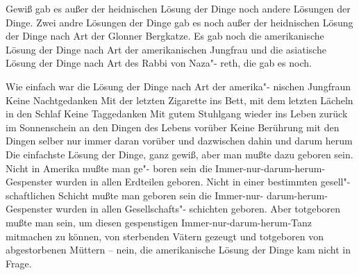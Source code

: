 Gewiß gab es außer der heidnischen Lösung der Dinge noch
andere Lösungen der Dinge. Zwei andre Lösungen der Dinge
gab es noch außer der heidnischen Lösung der Dinge nach Art
der Glonner Bergkatze. Es gab noch die amerikanische Lösung
der Dinge nach Art der amerikanischen Jungfrau und die
asiatische Lösung der Dinge nach Art des Rabbi von Naza"-%
reth, die gab es noch.

Wie einfach war die Lösung der Dinge nach Art der amerika"-%
nischen Jungfraun\ausr{} Keine Nachtgedanken\dopp{} Mit der letzten
Zigarette ins Bett, mit dem letzten Lächeln in den Schlaf\ausr{}
Keine Taggedanken\dopp{} Mit gutem Stuhlgang wieder ins
Leben zurück\semi{} im Sonnenschein an den Dingen des Lebens
vorüber\ausr{} Keine Berührung mit den Dingen selber\dopp{} nur immer
daran vorüber und dazwischen dahin und darum herum\ausr{}
Die einfachste Lösung der Dinge, ganz gewiß, aber man
mußte dazu geboren sein. Nicht in Amerika mußte man ge"-%
boren sein\dopp{} die Immer-nur-darum-herum-Gespenster wurden
in allen Erdteilen geboren. Nicht in einer bestimmten gesell"-%
schaftlichen Schicht mußte man geboren sein\dopp{} die Immer-nur-%
darum-herum-Gespenster wurden in allen Gesellschafts"-%
schichten geboren. Aber totgeboren mußte man sein, um diesen
gespenstigen Immer-nur-darum-herum-Tanz mitmachen zu
können, von sterbenden Vätern gezeugt und totgeboren von
abgestorbenen Müttern -- nein, die amerikanische Lösung der
Dinge kam nicht in Frage.

